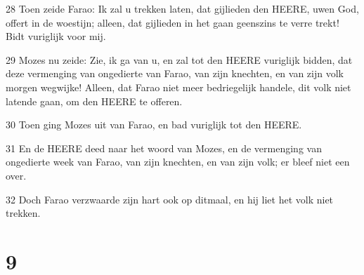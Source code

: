 \par 28 Toen zeide Farao: Ik zal u trekken laten, dat gijlieden den HEERE, uwen God, offert in de woestijn; alleen, dat gijlieden in het gaan geenszins te verre trekt! Bidt vuriglijk voor mij.
\par 29 Mozes nu zeide: Zie, ik ga van u, en zal tot den HEERE vuriglijk bidden, dat deze vermenging van ongedierte van Farao, van zijn knechten, en van zijn volk morgen wegwijke! Alleen, dat Farao niet meer bedriegelijk handele, dit volk niet latende gaan, om den HEERE te offeren.
\par 30 Toen ging Mozes uit van Farao, en bad vuriglijk tot den HEERE.
\par 31 En de HEERE deed naar het woord van Mozes, en de vermenging van ongedierte week van Farao, van zijn knechten, en van zijn volk; er bleef niet een over.
\par 32 Doch Farao verzwaarde zijn hart ook op ditmaal, en hij liet het volk niet trekken.

\chapter{9}

